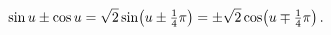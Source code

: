 \[\mathop{\sin\/}\nolimits u\pm\mathop{\cos\/}\nolimits u=\sqrt{2}\mathop{\sin\/%
}\nolimits\!\left(u\pm\tfrac{1}{4}\pi\right)=\pm\sqrt{2}\mathop{\cos\/}%
\nolimits\!\left(u\mp\tfrac{1}{4}\pi\right).\]